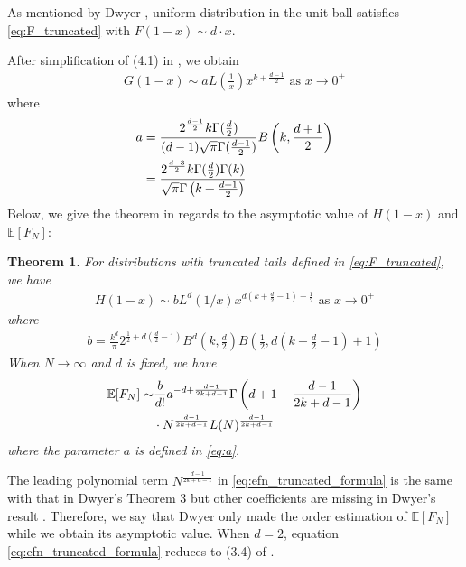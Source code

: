 \documentclass[conference,a4paper]{IEEEtran}
\def\E{\mathbb{E}}
\newtheorem{theorem}{Theorem}
\begin{document}
As mentioned by Dwyer \cite{dwyer1991convex}, uniform distribution
in the unit ball satisfies \eqref{eq:F_truncated} with
$F(1-x) \sim d\cdot x$.

After simplification of (4.1) in \cite{dwyer1991convex}, we obtain
\begin{align}
    G(1-x) \sim a
    L\left(\frac{1}{x} \right)
    x^{k+\frac{d-1}{2}} \textrm{ as } x \to 0^+ 
    \label{eq:truncated_G_1_x}
\end{align}
where
\begin{align}
a &=\frac{2^{\frac{d-1}{2}} k \Gamma(\frac{d}{2})}
    {(d-1) \sqrt{\pi} \Gamma(\frac{d-1}{2})}
    B\left(k, \frac{d+1}{2}\right) \notag \\
    &= \frac{2^{\frac{d-3}{2}} k \Gamma(\frac{d}{2})\Gamma(k)}
    {\sqrt{\pi} \Gamma\left(k+\frac{d+1}{2}\right)}
    \label{eq:a}
\end{align}
Below, we give the theorem in regards to the asymptotic value of $H(1-x)$ and $\E[F_N]$:
\begin{theorem}\label{thm:truncated_tails}
     For distributions with truncated tails
     defined in \eqref{eq:F_truncated},
     we have
\begin{align}
     H(1-x)  \sim b
     L^d(1/x) x^{d(k+\frac{d}{2}-1)+\frac{1}{2}} 
     \textrm{ as } x \to 0^+ \label{eq:truncated_H_1_x}
\end{align}
where
\begin{align}
     b =  \frac{k^d}{\pi}
     2^{\frac{1}{2} + d(\frac{d}{2}-1)} B^d\left(k, \frac{d}{2}\right)
     B\left( \frac{1}{2},
     d\left(k+\frac{d}{2} -1 \right)+1 \right)
     \label{eq:b}
 \end{align}
When $N\to \infty$ and $d$ is fixed, we have
 \begin{align}\label{eq:efn_truncated_formula}
     \E[F_N] \sim &\frac{b}{d!}a^{-d+\frac{d-1}{2k+d-1}}
     \Gamma 
     \left(d+1-\frac{d-1}{2k+d-1}\right)
     \notag\\
     &\cdot N^{\frac{d-1}{2k+d-1}}
     L(N)
     ^{\frac{d-1}{2k+d-1}}
 \end{align}
 where the parameter $a$ is defined in \eqref{eq:a}.
\end{theorem}
 The leading polynomial term $N^{\frac{d-1}{2k+d-1}}$ in \eqref{eq:efn_truncated_formula}
 is the same with that in Dwyer's Theorem 3
 but other coefficients are missing in Dwyer's result
 \cite{dwyer1991convex}. Therefore, we say that Dwyer only made the order estimation
 of $\E[F_N]$ while we obtain its asymptotic value.
 When $d=2$, equation \eqref{eq:efn_truncated_formula} reduces to (3.4) of \cite{carnal1970konvexe}.
\end{document}
